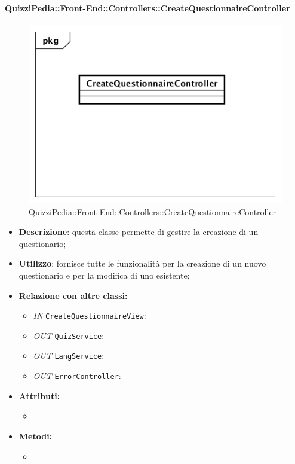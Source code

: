 \paragraph{QuizziPedia::Front-End::Controllers::CreateQuestionnaireController}
\begin{figure}
	\centering
	\includegraphics[scale=0.45]{UML/Classi/Front-End/QuizziPedia_Front-end_Controller_CreateQuestionnaireController.png}
	\caption{QuizziPedia::Front-End::Controllers::CreateQuestionnaireController}
\end{figure}
\begin{itemize}
	\item \textbf{Descrizione}: questa classe permette di gestire la creazione di un questionario;
	\item \textbf{Utilizzo}: fornisce tutte le funzionalità per la creazione di un nuovo questionario e per la modifica di uno esistente;
	\item \textbf{Relazione con altre classi:}
	\begin{itemize}
		\item \textit{IN} \texttt{CreateQuestionnaireView}:  
		\item \textit{OUT} \texttt{QuizService}: 
		\item \textit{OUT} \texttt{LangService}: 
		\item \textit{OUT} \texttt{ErrorController}: 
	\end{itemize}
	\item \textbf{Attributi:}
	\begin{itemize}
		\item 
	\end{itemize}
	\item \textbf{Metodi:}
	\begin{itemize}
		\item 
	\end{itemize}
\end{itemize}

